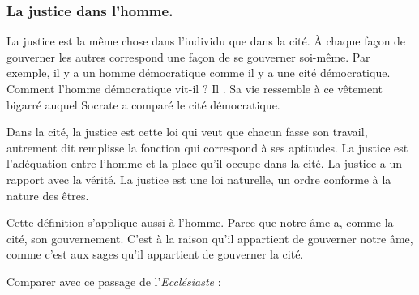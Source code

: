 \documentclass[fontsize=28pt,a4paper]{scrartcl}
\begin{document}

\subsubsection*{La justice dans l'homme.}

La justice est la même chose dans l'individu que dans la cité. À chaque façon de gouverner les autres correspond une façon de se gouverner soi-même. Par exemple, il y a un homme démocratique comme il y a une cité démocratique. Comment l'homme démocratique vit-il ? Il . Sa vie ressemble à ce vêtement bigarré auquel Socrate a comparé le cité démocratique.

Dans la cité, la justice est cette loi qui veut que chacun fasse son travail, autrement dit remplisse la fonction qui correspond à ses aptitudes. La justice est l'adéquation entre l'homme et la place qu'il occupe dans la cité. La justice a un rapport avec la vérité. La justice est une loi naturelle, un ordre conforme à la nature des êtres.

Cette définition s'applique aussi à l'homme. Parce que notre âme a, comme la cité, son gouvernement. C'est à la raison qu'il appartient de gouverner notre âme, comme c'est aux sages qu'il appartient de gouverner la cité.

Comparer avec ce passage de l'\textit{Ecclésiaste} : 
\end{document}
